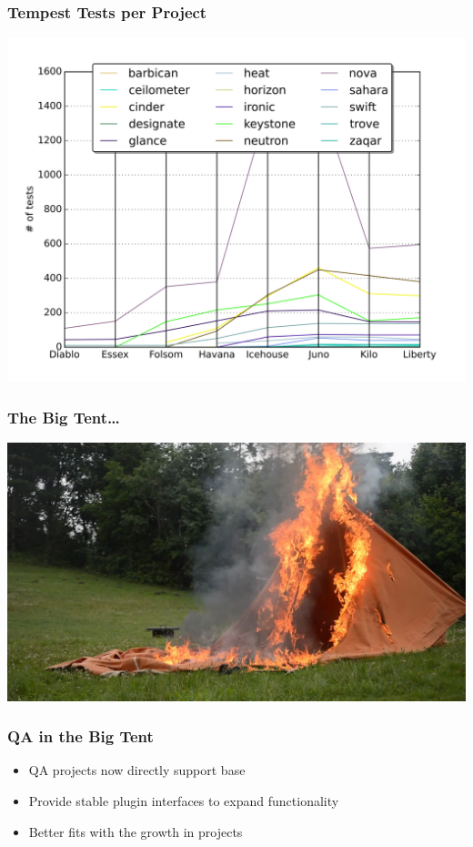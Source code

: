 \documentclass[aspectratio=169,11pt,hyperref={colorlinks=true}]{beamer}
\begin{document}
\begin{frame}
    \frametitle{Tempest Tests per Project}
    \begin{center}
        \includegraphics[width=.8\textwidth]{tests_per_proj.png}
    \end{center}
\end{frame}

\begin{frame}
    \frametitle{The Big Tent\ldots}
    \begin{center}
        \includegraphics[width=.9\textwidth]{Burning_Tent.jpg}
    \end{center}
\end{frame}

\begin{frame}
    \frametitle{QA in the Big Tent}
    \begin{itemize}
        \item QA projects now directly support base
        \item Provide stable plugin interfaces to expand functionality
        \item Better fits with the growth in projects
    \end{itemize}
\end{frame}
\end{document}
